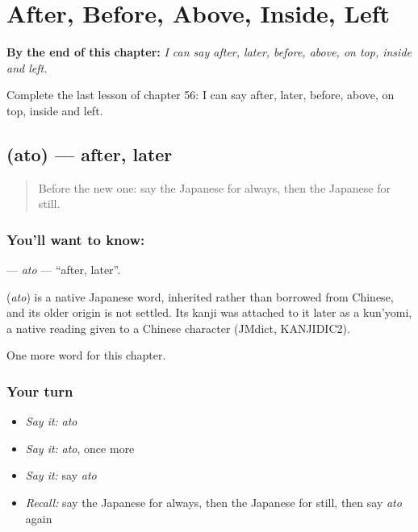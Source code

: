 
\chapter{After, Before, Above, Inside, Left}
\label{ch:ja-after-before-above-inside-left}

\begin{chapteropening}
\textbf{By the end of this chapter:} \emph{I can say after, later, before, above, on top, inside and left.}

Complete the last lesson of chapter 56: I can say after, later, before, above, on top, inside and left.
\end{chapteropening}

\section[\texorpdfstring{\ja{あと} (ato)}{あと (ato)}]{ (ato) — after, later}

\label{lesson:JA-C56-ato}



\begin{quote}
Before the new one: say the Japanese for always, then the Japanese for still.
\end{quote}

\subsection*{You'll want to know: }
\textbf{} — \emph{ato} — \textquotedblleft{}after, later\textquotedblright{}.

\begin{cousinweb}
\textbf{} (\emph{ato}) is a native Japanese word, inherited rather than borrowed from Chinese, and its older origin is not settled. Its kanji was attached to it later as a kun'yomi, a native reading given to a Chinese character (JMdict, KANJIDIC2).
\end{cousinweb}

\begin{grammarlens}[title={What you've built}]
One more word for this chapter.
\end{grammarlens}

\subsection*{Your turn}
\begin{itemize}
\raggedright
  \item \emph{Say it:} \emph{ato}
  \item \emph{Say it:} \emph{ato}, once more
  \item \emph{Say it:} say \emph{ato}
  \item \emph{Recall:} say the Japanese for always, then the Japanese for still, then say \emph{ato} again
\end{itemize}

